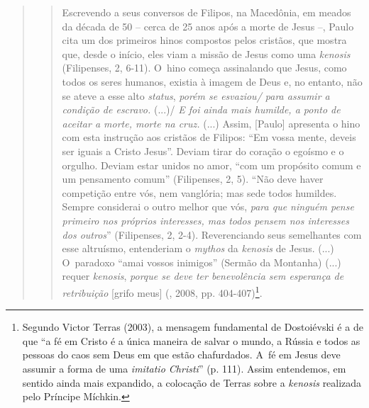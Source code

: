 {\begin{quote}
\begin{quote}
Escrevendo a seus conversos de Filipos, na Macedônia, em meados da
década de 50 -- cerca de 25 anos após a morte de Jesus --, Paulo cita um
dos primeiros hinos compostos pelos cristãos, que mostra que, desde o
início, eles viam a missão de Jesus como uma \emph{kenosis} (Filipenses,
2, 6-11). O~hino começa assinalando que Jesus, como todos os seres
humanos, existia à imagem de Deus e, no entanto, não se ateve a esse
alto \emph{status}, \emph{porém se esvaziou/ para assumir a condição de
escravo.} (...)/ \emph{E foi ainda mais humilde, a ponto de aceitar a
morte, morte na cruz.} (...) Assim, {[}Paulo{]} apresenta o hino com
esta instrução aos cristãos de Filipos: ``Em vossa mente, deveis ser
iguais a Cristo Jesus''. Deviam tirar do coração o egoísmo e o orgulho.
Deviam estar unidos no amor, ``com um propósito comum e um pensamento
comum'' (Filipenses, 2, 5). ``Não deve haver competição entre vós, nem
vanglória; mas sede todos humildes. Sempre considerai o outro melhor que
vós, \emph{para que ninguém pense primeiro nos próprios interesses, mas
todos pensem nos interesses dos outros}'' (Filipenses, 2, 2-4).
Reverenciando seus semelhantes com esse altruísmo, entenderiam o
\emph{mythos} da \emph{kenosis} de Jesus. (...) O~paradoxo ``amai vossos
inimigos'' (Sermão da Montanha) (...) requer \emph{kenosis},
\emph{porque se deve ter benevolência sem esperança de retribuição}
{[}grifo meus{]} (, 2008, pp. 404-407)\footnote{Segundo Victor
  Terras (2003), a mensagem fundamental de Dostoiévski é a de que ``a fé
  em Cristo é a única maneira de salvar o mundo, a Rússia e todos as
  pessoas do caos sem Deus em que estão chafurdados. A~fé em Jesus deve
  assumir a forma de uma \emph{imitatio Christi}'' (p. 111). Assim
  entendemos, em sentido ainda mais expandido, a colocação de Terras
  sobre a \emph{kenosis} realizada pelo Príncipe Míchkin.}.
\end{quote}


\end{quote}}
